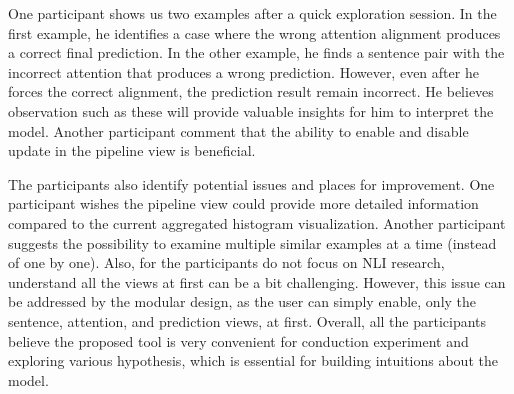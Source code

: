 One participant shows us two examples after a quick exploration session. 
In the first example, he identifies a case where the wrong attention alignment produces a correct final prediction.
%
In the other example, he finds a sentence pair with the incorrect attention that produces a wrong prediction. 
However, even after he forces the correct alignment, the prediction result remain incorrect. He believes observation such as these will provide valuable insights for him to interpret the model. 
%
Another participant comment that the ability to enable and disable update in the pipeline view is beneficial.

The participants also identify potential issues and places for improvement. 
One participant wishes the pipeline view could provide more detailed information compared to the current aggregated histogram visualization. 
Another participant suggests the possibility to examine multiple similar examples at a time (instead of one by one). 
%
Also, for the participants do not focus on NLI research, understand all the views at first can be a bit challenging. However, this issue can be addressed by the modular design, as the user can simply enable, only the sentence, attention, and prediction views, at first.
%
Overall, all the participants believe the proposed tool is very convenient for conduction experiment and exploring various hypothesis, which is essential for building intuitions about the model.



